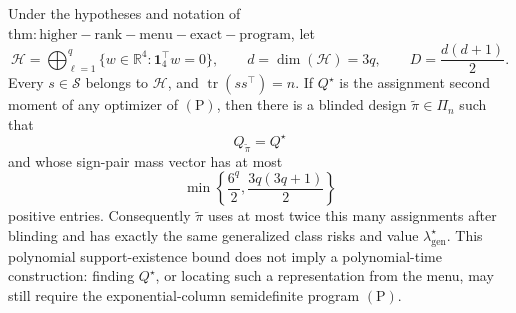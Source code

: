Under the hypotheses and notation of \(\mathrm{thm:higher-rank-menu-exact-program}\), let
\[
\mathcal H=\bigoplus_{\ell=1}^q\{w\in\mathbb R^4:\mathbf 1_4^\top w=0\},
\qquad d=\dim(\mathcal H)=3q,
\qquad D=\frac{d(d+1)}2.
\]
Every \(s\in\mathscr S\) belongs to \(\mathcal H\), and \(\operatorname{tr}(ss^\top)=n\).  If \(Q^\star\) is the assignment second moment of any optimizer of \((\mathrm P)\), then there is a blinded design \(\widetilde\pi\in\Pi_n\) such that
\[
Q_{\widetilde\pi}=Q^\star
\]
and whose sign-pair mass vector has at most
\[
\min\left\{\frac{6^q}{2},\frac{3q(3q+1)}2\right\}
\]
positive entries.  Consequently \(\widetilde\pi\) uses at most twice this many assignments after blinding and has exactly the same generalized class risks and value \(\lambda_{\mathrm{gen}}^\star\).  This polynomial support-existence bound does not imply a polynomial-time construction: finding \(Q^\star\), or locating such a representation from the menu, may still require the exponential-column semidefinite program \((\mathrm P)\).